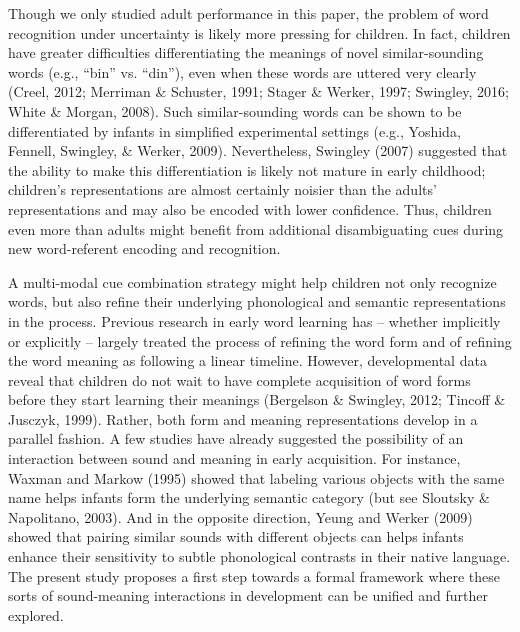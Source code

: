 \documentclass[english,,man,floatsintext]{apa6}
\theoremstyle{definition}
\theoremstyle{definition}
\theoremstyle{definition}
\theoremstyle{remark}
\begin{document}
Though we only studied adult performance in this paper, the problem of
word recognition under uncertainty is likely more pressing for children.
In fact, children have greater difficulties differentiating the meanings
of novel similar-sounding words (e.g., \enquote{bin} vs. \enquote{din}),
even when these words are uttered very clearly (Creel, 2012; Merriman \&
Schuster, 1991; Stager \& Werker, 1997; Swingley, 2016; White \& Morgan,
2008). Such similar-sounding words can be shown to be differentiated by
infants in simplified experimental settings (e.g., Yoshida, Fennell,
Swingley, \& Werker, 2009). Nevertheless, Swingley (2007) suggested that
the ability to make this differentiation is likely not mature in early
childhood; children's representations are almost certainly noisier than
the adults' representations and may also be encoded with lower
confidence. Thus, children even more than adults might benefit from
additional disambiguating cues during new word-referent encoding and
recognition.

A multi-modal cue combination strategy might help children not only
recognize words, but also refine their underlying phonological and
semantic representations in the process. Previous research in early word
learning has -- whether implicitly or explicitly -- largely treated the
process of refining the word form and of refining the word meaning as
following a linear timeline. However, developmental data reveal that
children do not wait to have complete acquisition of word forms before
they start learning their meanings (Bergelson \& Swingley, 2012; Tincoff
\& Jusczyk, 1999). Rather, both form and meaning representations develop
in a parallel fashion. A few studies have already suggested the
possibility of an interaction between sound and meaning in early
acquisition. For instance, Waxman and Markow (1995) showed that labeling
various objects with the same name helps infants form the underlying
semantic category (but see Sloutsky \& Napolitano, 2003). And in the
opposite direction, Yeung and Werker (2009) showed that pairing similar
sounds with different objects can helps infants enhance their
sensitivity to subtle phonological contrasts in their native language.
The present study proposes a first step towards a formal framework where
these sorts of sound-meaning interactions in development can be unified
and further explored.
\end{document}
